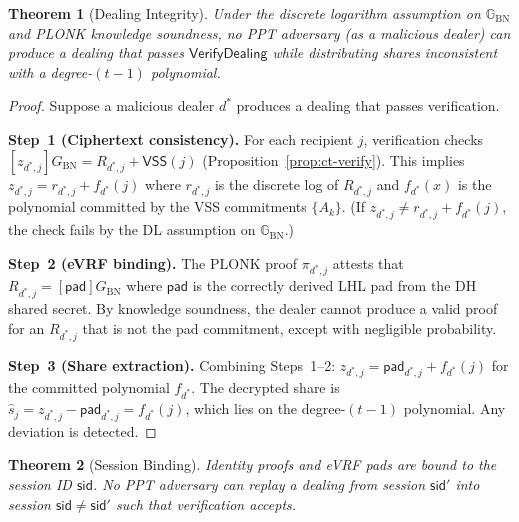 \documentclass[11pt,a4paper]{article}
\newtheorem{theorem}{Theorem}[section]
\newcommand{\G}{\mathbb{G}}
\newcommand{\Gbn}{\G_{\mathrm{BN}}}
\newcommand{\genbn}{G_{\mathrm{BN}}}
\newcommand{\sid}{\mathsf{sid}}
\newcommand{\pad}{\mathsf{pad}}
\newcommand{\VSS}{\mathsf{VSS}}
\begin{document}
\begin{theorem}[Dealing Integrity]
  \label{thm:dealing-integrity}
  Under the discrete logarithm assumption on $\Gbn$ and PLONK knowledge
  soundness, no PPT adversary (as a malicious dealer) can produce a dealing
  that passes $\mathsf{VerifyDealing}$ while distributing shares inconsistent
  with a degree-$(t{-}1)$ polynomial.
\end{theorem}

\begin{proof}
  Suppose a malicious dealer $d^*$ produces a dealing that passes verification.

  \smallskip\noindent\textbf{Step~1 (Ciphertext consistency).}
  For each recipient $j$, verification checks
  $[z_{d^*,j}]\genbn = R_{d^*,j} + \VSS(j)$ (Proposition~\ref{prop:ct-verify}).
  This implies $z_{d^*,j} = r_{d^*,j} + f_{d^*}(j)$ where $r_{d^*,j}$ is
  the discrete log of $R_{d^*,j}$ and $f_{d^*}(x)$ is the polynomial committed
  by the VSS commitments $\{A_k\}$. (If $z_{d^*,j} \ne r_{d^*,j} + f_{d^*}(j)$,
  the check fails by the DL assumption on $\Gbn$.)

  \smallskip\noindent\textbf{Step~2 (eVRF binding).}
  The PLONK proof $\pi_{d^*,j}$ attests that $R_{d^*,j} = [\pad]\genbn$
  where $\pad$ is the correctly derived LHL pad from the DH shared secret.
  By knowledge soundness, the dealer cannot produce a valid proof for an
  $R_{d^*,j}$ that is not the pad commitment, except with negligible
  probability.

  \smallskip\noindent\textbf{Step~3 (Share extraction).}
  Combining Steps~1--2: $z_{d^*,j} = \pad_{d^*,j} + f_{d^*}(j)$ for the
  committed polynomial $f_{d^*}$. The decrypted share is
  $\hat{s}_j = z_{d^*,j} - \pad_{d^*,j} = f_{d^*}(j)$, which lies on the
  degree-$(t{-}1)$ polynomial. Any deviation is detected.
\end{proof}

\begin{theorem}[Session Binding]
  \label{thm:session-binding}
  Identity proofs and eVRF pads are bound to the session ID $\sid$. No PPT
  adversary can replay a dealing from session $\sid'$ into session $\sid \ne
  \sid'$ such that verification accepts.
\end{theorem}
\end{document}

